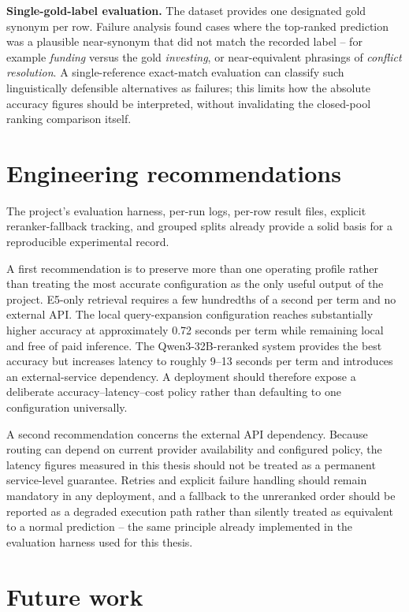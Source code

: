 \textbf{Single-gold-label evaluation.} The dataset provides one designated gold synonym per row. Failure analysis found cases where the top-ranked prediction was a plausible near-synonym that did not match the recorded label -- for example \emph{funding} versus the gold \emph{investing}, or near-equivalent phrasings of \emph{conflict resolution}. A single-reference exact-match evaluation can classify such linguistically defensible alternatives as failures; this limits how the absolute accuracy figures should be interpreted, without invalidating the closed-pool ranking comparison itself.

\section{Engineering recommendations}

The project's evaluation harness, per-run logs, per-row result files, explicit reranker-fallback tracking, and grouped splits already provide a solid basis for a reproducible experimental record.

A first recommendation is to preserve more than one operating profile rather than treating the most accurate configuration as the only useful output of the project. E5-only retrieval requires a few hundredths of a second per term and no external API. The local query-expansion configuration reaches substantially higher accuracy at approximately 0.72 seconds per term while remaining local and free of paid inference. The Qwen3-32B-reranked system provides the best accuracy but increases latency to roughly 9--13 seconds per term and introduces an external-service dependency. A deployment should therefore expose a deliberate accuracy--latency--cost policy rather than defaulting to one configuration universally.

A second recommendation concerns the external API dependency. Because routing can depend on current provider availability and configured policy, the latency figures measured in this thesis should not be treated as a permanent service-level guarantee. Retries and explicit failure handling should remain mandatory in any deployment, and a fallback to the unreranked order should be reported as a degraded execution path rather than silently treated as equivalent to a normal prediction -- the same principle already implemented in the evaluation harness used for this thesis.

\section{Future work}

